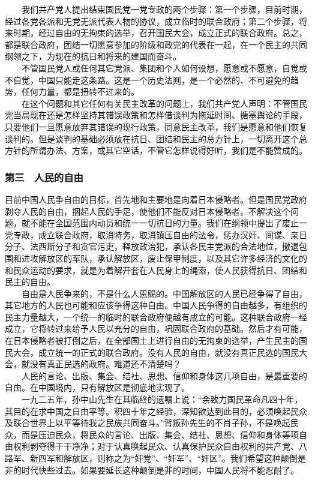 \documentclass[cn,11pt,chinese]{elegantbook}
\def\myformat#1{\hfil\hfil #1}
\begin{document}
　　我们共产党人提出结束国民党一党专政的两个步骤：第一个步骤，目前时期，经过各党各派和无党无派代表人物的协议，成立临时的联合政府；第二个步骤，将来时期，经过自由的无拘束的选举，召开国民大会，成立正式的联合政府。总之，都是联合政府，团结一切愿意参加的阶级和政党的代表在一起，在一个民主的共同纲领之下，为现在的抗日和将来的建国而奋斗。\\
　　不管国民党人或任何其它党派、集团和个人如何设想，愿意或不愿意，自觉或不自觉，中国只能走这条路。这是一个历史法则，是一个必然的、不可避免的趋势，任何力量，都是扭转不过来的。\\
　　在这个问题和其它任何有关民主改革的问题上，我们共产党人声明：不管国民党当局现在还是怎样坚持其错误政策和怎样借谈判为拖延时间、搪塞舆论的手段，只要他们一旦愿意放弃其错误的现行政策，同意民主改革，我们是愿意和他们恢复谈判的。但是谈判的基础必须放在抗日、团结和民主的总方针上，一切离开这个总方针的所谓办法、方案，或其它空话，不管它怎样说得好听，我们是不能赞成的。\\
\subsubsection*{\myformat{第三　人民的自由}}
目前中国人民争自由的目标，首先地和主要地是向着日本侵略者。但是国民党政府剥夺人民的自由，捆起人民的手足，使他们不能反对日本侵略者。不解决这个问题，就不能在全国范围内动员和统一一切抗日的力量。我们在纲领中提出了废止一党专政，成立联合政府，取消特务，取消镇压自由的法令，惩办汉奸、间谍、亲日分子、法西斯分子和贪官污吏，释放政治犯，承认各民主党派的合法地位，撤退包围和进攻解放区的军队，承认解放区，废止保甲制度，以及其它许多经济的文化的和民众运动的要求，就是为着解开套在人民身上的绳索，使人民获得抗日、团结和民主的自由。\\
　　自由是人民争来的，不是什么人恩赐的。中国解放区的人民已经争得了自由，其它地方的人民也可能和应该争得这种自由。中国人民争得的自由越多，有组织的民主力量越大，一个统一的临时的联合政府便越有成立的可能。这种联合政府一经成立，它将转过来给予人民以充分的自由，巩固联合政府的基础。然后才有可能，在日本侵略者被打倒之后，在全部国土上进行自由的无拘束的选举，产生民主的国民大会，成立统一的正式的联合政府。没有人民的自由，就没有真正民选的国民大会，就没有真正民选的政府。难道还不清楚吗？\\
　　人民的言论、出版、集会、结社、思想、信仰和身体这几项自由，是最重要的自由。在中国境内，只有解放区是彻底地实现了。\\
　　一九二五年，孙中山先生在其临终的遗嘱上说：“余致力国民革命凡四十年，其目的在求中国之自由平等。积四十年之经验，深知欲达到此目的，必须唤起民众及联合世界上以平等待我之民族共同奋斗。”背叛孙先生的不肖子孙，不是唤起民众，而是压迫民众，将民众的言论、出版、集会、结社、思想、信仰和身体等项自由权利剥夺得干干净净；对于认真唤起民众、认真保护民众自由权利的共产党、八路军、新四军和解放区，则称之为“奸党”、“奸军”、“奸区”。我们希望这种颠倒是非的时代快些过去。如果要延长这种颠倒是非的时间，中国人民将不能忍耐了。\\
\end{document}
